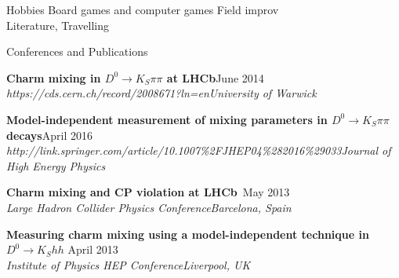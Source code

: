 \documentclass{format/resume} %
\begin{document}

\begin{rSection}{Hobbies}
  Board games and computer games
  Field improv \\
  Literature, Travelling \\
\end{rSection}


\begin{rSection}{Conferences and Publications}

  {\bf Charm mixing in $D^{0}\rightarrow K_{S}\pi\pi$ at LHCb}\hfill{June 2014}\\
  {\it https://cds.cern.ch/record/2008671?ln=en}\hfill{\it University of Warwick}

  {\bf Model-independent measurement of mixing parameters in $D^{0}\rightarrow K_{S}\pi\pi$ decays}\hfill{April 2016}\\
  {\it http://link.springer.com/article/10.1007\%2FJHEP04\%282016\%29033}\hfill{\it Journal of High Energy Physics}


  {\bf Charm mixing and CP violation at LHCb}\hfill{\ May 2013}\\
  {\it Large Hadron Collider Physics Conference}\hfill{\it Barcelona, Spain}

  {\bf Measuring charm mixing using a model-independent technique in $D^{0} \rightarrow K_{S}hh$}\hfill{ April 2013}\\
  {\it Institute of Physics HEP Conference}\hfill{\it Liverpool, UK}

\end{rSection}


\end{document}

